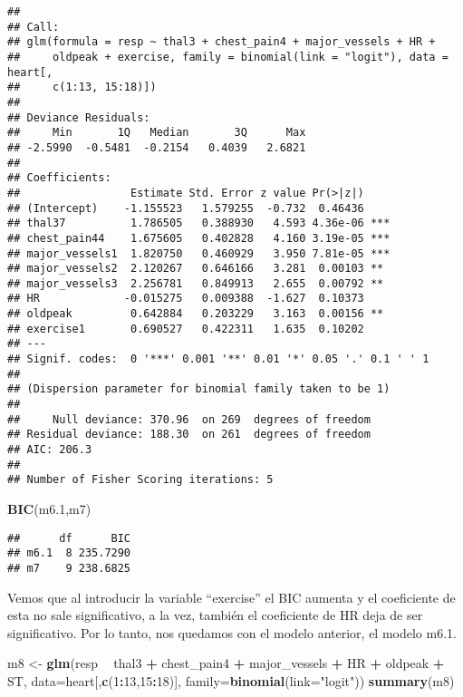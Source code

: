 \documentclass[]{article}
\newenvironment{Shaded}{\begin{snugshade}}{\end{snugshade}}
\newcommand{\KeywordTok}[1]{\textcolor[rgb]{0.13,0.29,0.53}{\textbf{#1}}}
\newcommand{\DataTypeTok}[1]{\textcolor[rgb]{0.13,0.29,0.53}{#1}}
\newcommand{\DecValTok}[1]{\textcolor[rgb]{0.00,0.00,0.81}{#1}}
\newcommand{\StringTok}[1]{\textcolor[rgb]{0.31,0.60,0.02}{#1}}
\newcommand{\OperatorTok}[1]{\textcolor[rgb]{0.81,0.36,0.00}{\textbf{#1}}}
\newcommand{\NormalTok}[1]{#1}
\begin{document}
\begin{verbatim}
## 
## Call:
## glm(formula = resp ~ thal3 + chest_pain4 + major_vessels + HR + 
##     oldpeak + exercise, family = binomial(link = "logit"), data = heart[, 
##     c(1:13, 15:18)])
## 
## Deviance Residuals: 
##     Min       1Q   Median       3Q      Max  
## -2.5990  -0.5481  -0.2154   0.4039   2.6821  
## 
## Coefficients:
##                 Estimate Std. Error z value Pr(>|z|)    
## (Intercept)    -1.155523   1.579255  -0.732  0.46436    
## thal37          1.786505   0.388930   4.593 4.36e-06 ***
## chest_pain44    1.675605   0.402828   4.160 3.19e-05 ***
## major_vessels1  1.820750   0.460929   3.950 7.81e-05 ***
## major_vessels2  2.120267   0.646166   3.281  0.00103 ** 
## major_vessels3  2.256781   0.849913   2.655  0.00792 ** 
## HR             -0.015275   0.009388  -1.627  0.10373    
## oldpeak         0.642884   0.203229   3.163  0.00156 ** 
## exercise1       0.690527   0.422311   1.635  0.10202    
## ---
## Signif. codes:  0 '***' 0.001 '**' 0.01 '*' 0.05 '.' 0.1 ' ' 1
## 
## (Dispersion parameter for binomial family taken to be 1)
## 
##     Null deviance: 370.96  on 269  degrees of freedom
## Residual deviance: 188.30  on 261  degrees of freedom
## AIC: 206.3
## 
## Number of Fisher Scoring iterations: 5
\end{verbatim}

\begin{Shaded}
\begin{Highlighting}[]
\KeywordTok{BIC}\NormalTok{(m6.}\DecValTok{1}\NormalTok{,m7)}
\end{Highlighting}
\end{Shaded}

\begin{verbatim}
##      df      BIC
## m6.1  8 235.7290
## m7    9 238.6825
\end{verbatim}

Vemos que al introducir la variable ``exercise'' el BIC aumenta y el
coeficiente de esta no sale significativo, a la vez, también el
coeficiente de HR deja de ser significativo. Por lo tanto, nos quedamos
con el modelo anterior, el modelo m6.1.

\begin{Shaded}
\begin{Highlighting}[]
\NormalTok{m8 <-}\StringTok{ }\KeywordTok{glm}\NormalTok{(resp }\OperatorTok{~}\StringTok{ }\NormalTok{thal3 }\OperatorTok{+}\StringTok{ }\NormalTok{chest_pain4 }\OperatorTok{+}\StringTok{ }\NormalTok{major_vessels }\OperatorTok{+}\StringTok{ }\NormalTok{HR }\OperatorTok{+}\StringTok{ }\NormalTok{oldpeak }\OperatorTok{+}\StringTok{ }\NormalTok{ST, }\DataTypeTok{data=}\NormalTok{heart[,}\KeywordTok{c}\NormalTok{(}\DecValTok{1}\OperatorTok{:}\DecValTok{13}\NormalTok{,}\DecValTok{15}\OperatorTok{:}\DecValTok{18}\NormalTok{)], }\DataTypeTok{family=}\KeywordTok{binomial}\NormalTok{(}\DataTypeTok{link=}\StringTok{"logit"}\NormalTok{)) }
\KeywordTok{summary}\NormalTok{(m8)}
\end{Highlighting}
\end{Shaded}
\end{document}
